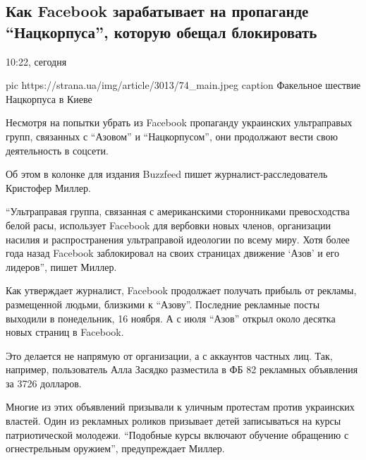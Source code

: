  
 
 

\subsection{Как Facebook зарабатывает на пропаганде \enquote{Нацкорпуса}, которую обещал блокировать}

10:22, сегодня 

\ifcmt
pic https://strana.ua/img/article/3013/74_main.jpeg
caption Факельное шествие Нацкорпуса в Киеве
\fi

Несмотря на попытки убрать из Facebook пропаганду украинских ультраправых
групп, связанных с \enquote{Азовом} и \enquote{Нацкорпусом}, они продолжают вести свою
деятельность в соцсети. 

Об этом в колонке для издания Buzzfeed пишет журналист-расследователь Кристофер
Миллер. 

\enquote{Ультраправая группа, связанная с американскими сторонниками превосходства
белой расы, использует Facebook для вербовки новых членов, организации насилия
и распространения ультраправой идеологии по всему миру. Хотя более года назад
Facebook заблокировал на своих страницах движение \enquote{Азов} и его лидеров}, \dshM пишет Миллер.

Как утверждает журналист, Facebook продолжает получать прибыль от рекламы,
размещенной людьми, близкими к \enquote{Азову}. Последние рекламные посты выходили в
понедельник, 16 ноября. А с июля \enquote{Азов} открыл около десятка новых страниц в
Facebook.

Это делается не напрямую от организации, а с аккаунтов частных лиц. Так,
например, пользователь Алла Засядко разместила в ФБ 82 рекламных объявления за
3726 долларов.

Многие из этих объявлений призывали к уличным протестам против украинских
властей. Один из рекламных роликов призывает детей записываться на курсы
патриотической молодежи. \enquote{Подобные курсы включают обучение обращению с
огнестрельным оружием}, \dshM предупреждает Миллер.

